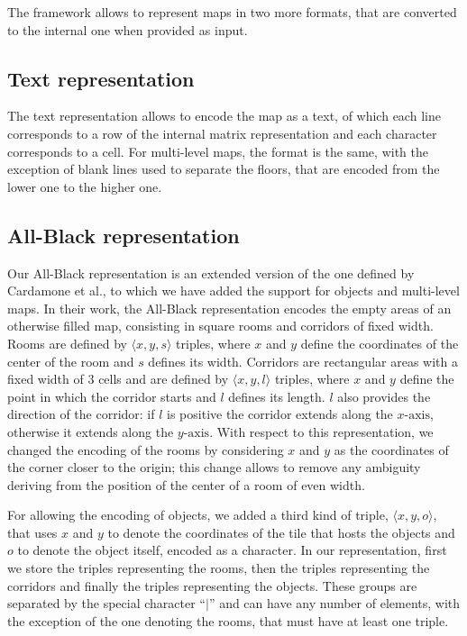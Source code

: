 \par

The framework allows to represent maps in two more formats, that are converted to the internal one when provided as input.


\subsection{Text representation}

The text representation allows to encode the map as a text, of which each line corresponds to a row of the internal matrix representation and each character corresponds to a cell. For multi-level maps, the format is the same, with the exception of blank lines used to separate the floors, that are encoded from the lower one to the higher one.


\subsection{All-Black representation}

Our All-Black representation is an extended version of the one defined by Cardamone et al.\cite{Cardamone:2011:EIM:2008402.2008411}, to which we have added the support for objects and multi-level maps. In their work, the All-Black representation encodes the empty areas of an otherwise filled map, consisting in square rooms and corridors of fixed width. Rooms are defined by $\langle x,y,s \rangle$ triples, where $x$ and $y$ define the coordinates of the center of the room and $s$ defines its width. Corridors are rectangular areas with a fixed width of $3$ cells and are defined by $\langle x,y,l \rangle$ triples, where $x$ and $y$ define the point in which the corridor starts and $l$ defines its length. $l$ also provides the direction of the corridor: if $l$ is positive the corridor extends along the $x\text{-axis}$, otherwise it extends along the $y\text{-axis}$. With respect to this representation, we changed the encoding of the rooms by considering $x$ and $y$ as the coordinates of the corner closer to the origin; this change allows to remove any ambiguity deriving from the position of the center of a room of even width.

\par

For allowing the encoding of objects, we added a third kind of triple, $\langle x,y,o \rangle$, that uses $x$ and $y$ to denote the coordinates of the tile that hosts the objects and $o$ to denote the object itself, encoded as a character. In our representation, first we store the triples representing the rooms, then the triples representing the corridors and finally the triples representing the objects. These groups are separated by the special character ``$\mid$'' and can have any number of elements, with the exception of the one denoting the rooms, that must have at least one triple.

